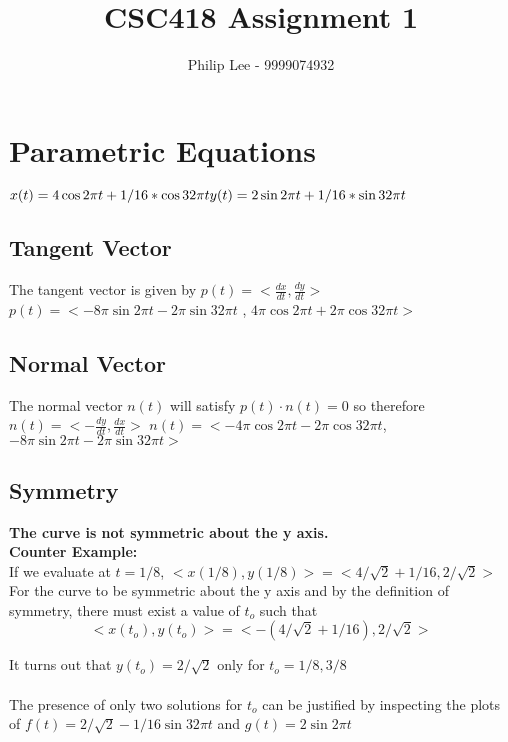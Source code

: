 \documentclass[a4paper,10pt]{scrartcl}
\title{CSC418 Assignment 1}
\author{Philip Lee - 9999074932}
\begin{document}
\maketitle


\section{Parametric Equations}
$x(t) = 4\cos{2\pi t} + 1/16 * \cos{32\pi t} \\ y(t) = 2\sin{2\pi t} + 1/16 * \sin{32\pi t}$

\subsection{Tangent Vector}

The tangent vector is given by $p(t) = <\frac{dx}{dt}, \frac{dy}{dt}>$\\
$ p(t) = <-8\pi\sin{2\pi t} - 2\pi\sin{32\pi t}$ , $ 4\pi\cos{2\pi t} + 2\pi\cos{32\pi t}>$

\subsection{Normal Vector}

The normal vector $n(t)$ will satisfy $p(t) \cdot n(t) = 0$ so therefore $n(t) = <- \frac{dy}{dt}, \frac{dx}{dt}>$
$ n(t) =  < - 4\pi\cos{2\pi t} - 2\pi\cos{32\pi t}$, $-8\pi\sin{2\pi t} - 2\pi\sin{32\pi t}>$

\subsection{Symmetry}

{\bfseries The curve is not symmetric about the y axis.}\\

{\bfseries Counter Example:}\\

If we evaluate at $t = 1/8$,  $<x(1/8), y(1/8)> = <4/\sqrt{2} + 1/16, 2/\sqrt{2}>$\\
For the curve to be symmetric about the y axis and by the definition of symmetry,
there must exist a value of $t_o$ such that
\[<x(t_o), y(t_o)> = <-(4/\sqrt{2} + 1/16), 2/\sqrt{2}>\]

It turns out that $y(t_o) = 2/\sqrt{2}$ only for $t_o = 1/8, 3/8$ \\\\
The presence of only two solutions for $t_o$ can be justified by inspecting
the plots of $f(t) = 2/\sqrt{2} - 1/16\sin{32\pi t}$ and $g(t) = 2\sin{2\pi t}$
\end{document}
